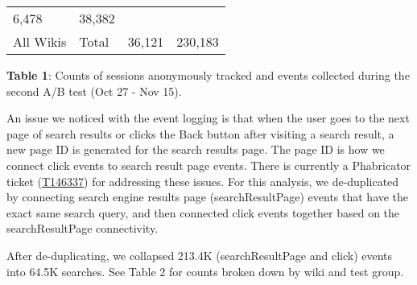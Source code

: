 \documentclass[12pt,]{article}
\begin{document}
\begin{longtable}[]{@{}llrr@{}}
\begin{minipage}[t]{0.13\columnwidth}
6,478\strut
\end{minipage} & \begin{minipage}[t]{0.13\columnwidth}\raggedleft\strut
38,382\strut
\end{minipage}\tabularnewline
\begin{minipage}[t]{0.08\columnwidth}\raggedright\strut
All Wikis\strut
\end{minipage} & \begin{minipage}[t]{0.55\columnwidth}\raggedright\strut
Total\strut
\end{minipage} & \begin{minipage}[t]{0.13\columnwidth}\raggedleft\strut
36,121\strut
\end{minipage} & \begin{minipage}[t]{0.13\columnwidth}\raggedleft\strut
230,183\strut
\end{minipage}\tabularnewline
\bottomrule
\end{longtable}

\textbf{Table 1}: Counts of sessions anonymously tracked and events
collected during the second A/B test (Oct 27 - Nov 15).

An issue we noticed with the event logging is that when the user goes to
the next page of search results or clicks the Back button after visiting
a search result, a new page ID is generated for the search results page.
The page ID is how we connect click events to search result page events.
There is currently a Phabricator ticket
(\href{https://phabricator.wikimedia.org/T146337}{T146337}) for
addressing these issues. For this analysis, we de-duplicated by
connecting search engine results page (searchResultPage) events that
have the exact same search query, and then connected click events
together based on the searchResultPage connectivity.

After de-duplicating, we collapsed 213.4K (searchResultPage and click)
events into 64.5K searches. See Table 2 for counts broken down by wiki
and test group.
\end{document}

